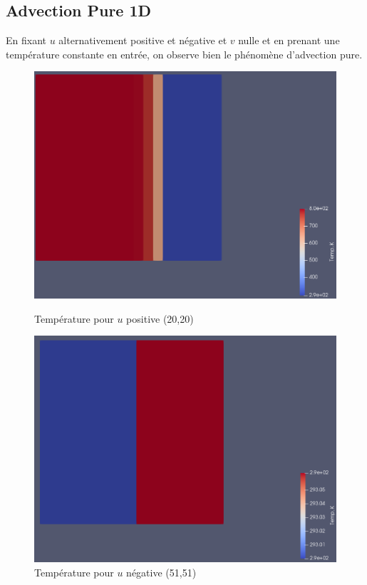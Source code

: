 \documentclass[a4paper,oneside]{article}
\begin{document}
\subsection{Advection Pure 1D}

En fixant $u$ alternativement positive et négative et $v$ nulle et en prenant une température constante en entrée, on observe bien le phénomène d'advection pure.





\begin{figure}[h]
    \begin{minipage}[c]{.46\linewidth}
        \centering
        \includegraphics[scale=0.18]{Advection_Pure_1D/AdvGauche.png}
        \caption{Température pour $u$ positive  (20,20)}
    \end{minipage}
    \hfill%
    \begin{minipage}[c]{.46\linewidth}
        \centering
        \includegraphics[scale=0.18]{Advection_Pure_1D/AdvDroite.png}
        \caption{Température pour $u$ négative (51,51)}
    \end{minipage}
\end{figure}
\end{document}
